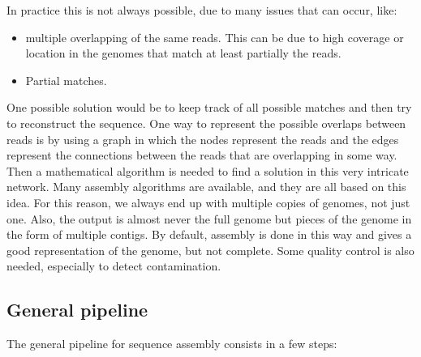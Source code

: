     In practice this is not always possible, due to many issues that can occur, like:

    \begin{multicols}{2}
        \begin{itemize}
            \item multiple overlapping of the same reads.
                This can be due to high coverage or location in the genomes that match at least partially the reads.
            \item Partial matches.
        \end{itemize}
    \end{multicols}

    One possible solution would be to keep track of all possible matches and then try to reconstruct the sequence.
    One way to represent the possible overlaps between reads is by using a graph in which the nodes represent the reads and the edges represent the connections between the reads that are overlapping in some way.
    Then a mathematical algorithm is needed to find a solution in this very intricate network.
    Many assembly algorithms are available, and they are all based on this idea.
    For this reason, we always end up with multiple copies of genomes, not just one.
    Also, the output is almost never the full genome but pieces of the genome in the form of multiple contigs.
    By default, assembly is done in this way and gives a good representation of the genome, but not complete. Some quality control is also needed, especially to detect contamination.

    \subsection{General pipeline}
    The general pipeline for sequence assembly consists in a few steps:

